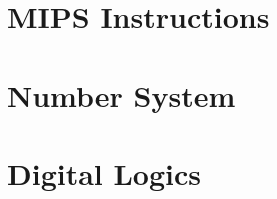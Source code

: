 \documentclass{article}
\begin{document}
\thispagestyle{empty}


\begin{minipage}[t]{0.48\linewidth}
    \section*{MIPS Instructions}
    
\end{minipage}
\hfill
\begin{minipage}[t]{0.2\linewidth}
    \section*{Number System}
    \centering
    
\end{minipage}
\hfill
\begin{minipage}[t]{0.28\linewidth}
    \section*{Digital Logics}
    
\end{minipage}
\end{document}
